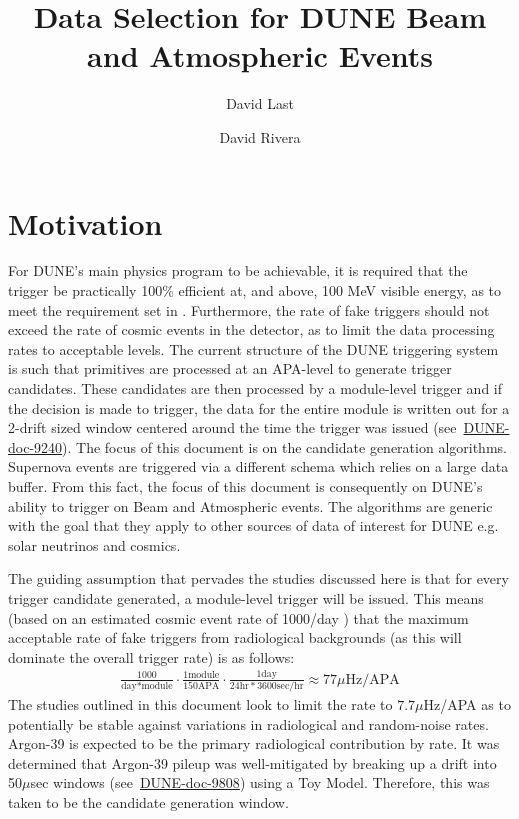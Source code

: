 \documentclass[11pt]{article}
\title{\vspace*{\fill} \textbf{Data Selection for DUNE Beam and Atmospheric Events}}
\author[1]{David Last}
\author[1]{David Rivera}
\affil{University of Pennsylvania}
\begin{document}
\maketitle
\mbox{}
\vspace*{4in}
\newpage


\maketitle

\section{Motivation}
For DUNE's main physics program to be achievable, it is required that the trigger be practically 100\% efficient at, and above, 100 MeV visible energy, as to meet the requirement set in %
. Furthermore, the rate of fake triggers should not exceed the rate of cosmic events in the detector, as to limit the data processing rates to acceptable levels. The current structure of the DUNE triggering system is such that primitives are processed at an APA-level to generate trigger candidates. These candidates are then processed by a module-level trigger and if the decision is made to trigger, the data for the entire module is written out for a 2-drift sized window centered around the time the trigger was issued (see~\href{https://docs.dunescience.org/cgi-bin/private/ShowDocument?docid=9240}{DUNE-doc-9240}).
The focus of this document is on the candidate generation algorithms. Supernova events are triggered via a different schema which relies on a large data buffer. From this fact, the focus of this document is consequently on DUNE's ability to trigger on Beam and Atmospheric events. The algorithms are generic with the goal that they apply to other sources of data of interest for DUNE e.g. solar neutrinos and cosmics.

The guiding assumption that pervades the studies discussed here is that for every trigger candidate generated, a module-level trigger will be issued. This means (based on an estimated cosmic event rate of 1000/day
) that the maximum acceptable rate of fake triggers from radiological backgrounds (as this will dominate the overall trigger rate) is as follows:
\begin{align*}
    \frac{1000}{\text{day}*\text{module}}\cdot\frac{1\text{module}}{150\text{APA}}\cdot\frac{1\text{day}}{24 \text{hr}*3600\text{sec}/\text{hr}}\approx 77\mu \text{Hz}/\text{APA}
\end{align*}
The studies outlined in this document look to limit the rate to $7.7\mu$Hz/APA as to potentially be stable against variations in radiological and random-noise rates. Argon-39 is expected to be the primary radiological contribution by rate. It was determined that Argon-39 pileup was well-mitigated by breaking up a drift into 50$\mu$sec windows (see~\href{https://docs.dunescience.org/cgi-bin/private/ShowDocument?docid=9808}{DUNE-doc-9808}) using a Toy Model. Therefore, this was taken to be the candidate generation window.
\end{document}
